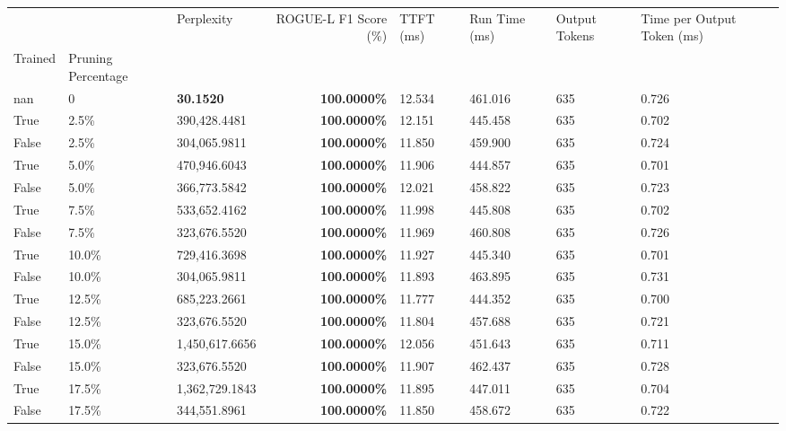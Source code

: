 \begin{table}[H]
\label{tab:evaluation-pipeline-9}
\begin{tabular}{lllrllll}
\toprule
 &  & Perplexity & ROGUE-L F1 Score (\%) & TTFT (ms) & Run Time (ms) & Output Tokens & Time per Output Token (ms) \\
Trained & Pruning Percentage &  &  &  &  &  &  \\
\midrule
nan & 0 & \bfseries 30.1520 & \bfseries 100.0000\% & 12.534 & 461.016 & 635 & 0.726 \\
\cline{1-8}
True & 2.5\% & 390,428.4481 & \bfseries \color{red} 100.0000\% & 12.151 & 445.458 & 635 & 0.702 \\
\cline{1-8}
False & 2.5\% & 304,065.9811 & \bfseries \color{red} 100.0000\% & 11.850 & 459.900 & 635 & 0.724 \\
\cline{1-8}
True & 5.0\% & 470,946.6043 & \bfseries \color{red} 100.0000\% & 11.906 & 444.857 & 635 & 0.701 \\
\cline{1-8}
False & 5.0\% & 366,773.5842 & \bfseries \color{red} 100.0000\% & 12.021 & 458.822 & 635 & 0.723 \\
\cline{1-8}
True & 7.5\% & 533,652.4162 & \bfseries \color{red} 100.0000\% & 11.998 & 445.808 & 635 & 0.702 \\
\cline{1-8}
False & 7.5\% & 323,676.5520 & \bfseries \color{red} 100.0000\% & 11.969 & 460.808 & 635 & 0.726 \\
\cline{1-8}
True & 10.0\% & 729,416.3698 & \bfseries \color{red} 100.0000\% & 11.927 & 445.340 & 635 & 0.701 \\
\cline{1-8}
False & 10.0\% & 304,065.9811 & \bfseries \color{red} 100.0000\% & 11.893 & 463.895 & 635 & 0.731 \\
\cline{1-8}
True & 12.5\% & 685,223.2661 & \bfseries \color{red} 100.0000\% & 11.777 & 444.352 & 635 & 0.700 \\
\cline{1-8}
False & 12.5\% & 323,676.5520 & \bfseries \color{red} 100.0000\% & 11.804 & 457.688 & 635 & 0.721 \\
\cline{1-8}
True & 15.0\% & 1,450,617.6656 & \bfseries \color{red} 100.0000\% & 12.056 & 451.643 & 635 & 0.711 \\
\cline{1-8}
False & 15.0\% & 323,676.5520 & \bfseries \color{red} 100.0000\% & 11.907 & 462.437 & 635 & 0.728 \\
\cline{1-8}
True & 17.5\% & 1,362,729.1843 & \bfseries \color{red} 100.0000\% & 11.895 & 447.011 & 635 & 0.704 \\
\cline{1-8}
False & 17.5\% & 344,551.8961 & \bfseries \color{red} 100.0000\% & 11.850 & 458.672 & 635 & 0.722 \\

\end{tabular}
\end{table}
